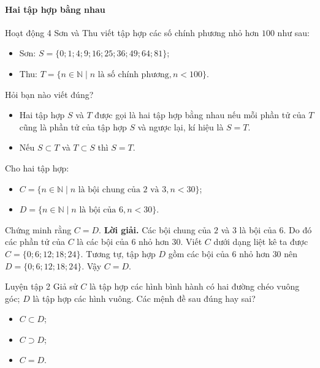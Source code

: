 \begin{kienthuc}
	\paragraph{Hai tập hợp bằng nhau}
	\begin{hoatdong}{Hoạt động 4}
		Sơn và Thu viết tập hợp các số chính phương nhỏ hơn $100$ như sau:
		\begin{itemize}
			\item Sơn: $S = \{0; 1; 4; 9; 16; 25; 36; 49; 64; 81\}$;
			\item Thu: $T = \{n \in \mathbb{N} \mid n \text{ là số chính phương}, n < 100\}$.
		\end{itemize}
		Hỏi bạn nào viết đúng?
	\end{hoatdong}
	\begin{itemize}
		\item Hai tập hợp $S$ và $T$ được gọi là hai tập hợp bằng nhau nếu mỗi phần tử của $T$ cũng là phần tử của tập hợp $S$ và ngược lại, kí hiệu là $S = T$.
		\item Nếu $S \subset T$ và $T \subset S$ thì $S = T$.
	\end{itemize}
	\begin{vd}
		Cho hai tập hợp:
		\begin{itemize}
			\item $C = \{n \in \mathbb{N} \mid n \text{ là bội chung của 2 và 3}, n < 30\}$;
			\item $D = \{n \in \mathbb{N} \mid n \text{ là bội của 6}, n < 30\}$.
		\end{itemize}
		Chứng minh rằng $C = D$.
		\textbf{Lời giải.}
		Các bội chung của $2$ và $3$ là bội của $6$. Do đó các phần tử của $C$ là các bội của $6$ nhỏ hơn $30$. Viết $C$ dưới dạng liệt kê ta được $C = \{0; 6; 12; 18; 24\}$. Tương tự, tập hợp $D$ gồm các bội của $6$ nhỏ hơn $30$ nên $D = \{0; 6; 12; 18; 24\}$. Vậy $C = D$.
	\end{vd}
	\begin{hoatdong}{Luyện tập 2}
		Giả sử $C$ là tập hợp các hình bình hành có hai đường chéo vuông góc; $D$ là tập hợp các hình vuông. Các mệnh đề sau đúng hay sai?
		\begin{itemize}
			\item[a)] $C \subset D$;
			\item[b)] $C \supset D$;
			\item[c)] $C = D$.
		\end{itemize}
	\end{hoatdong}
\end{kienthuc}

